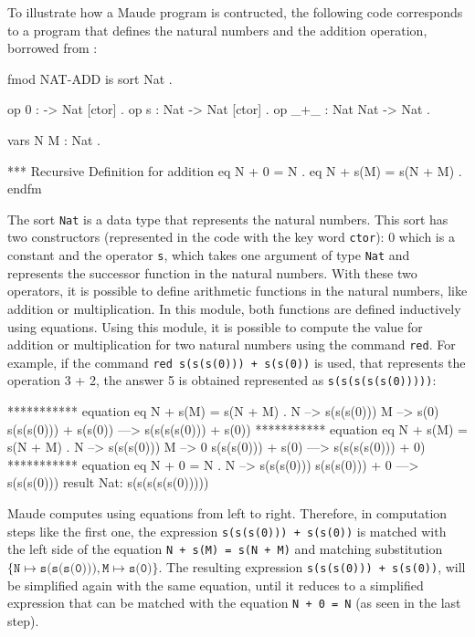 To illustrate how a Maude program is contructed, the following code corresponds to a program that defines the natural numbers and the addition operation, borrowed from \cite{PeterMaude}: 
\\
\begin{maude}
fmod NAT-ADD is
  sort Nat .

  op 0 : -> Nat [ctor] .
  op s : Nat -> Nat [ctor] .
  op _+_ : Nat Nat -> Nat .

  vars N M : Nat .
    
  *** Recursive Definition for addition
  eq N + 0 = N .
  eq N + s(M) = s(N + M) .
endfm
\end{maude}
The sort \texttt{Nat} is a data type that represents the natural numbers. This sort has two constructors (represented in the code with the key word \texttt{ctor}): 0 which is a constant and the operator \texttt{s}, which takes one argument of type \texttt{Nat} and represents the successor function in the natural numbers. With these two operators, it is possible to define arithmetic functions in the natural numbers, like addition or multiplication. In this module, both functions are defined inductively using equations. Using this module, it is possible to compute the value for addition or multiplication for two natural numbers using the command \texttt{red}. For example, if the command \texttt{red s(s(s(0))) + s(s(0))} is used, that represents the operation 3 + 2, the answer 5 is obtained represented as \texttt{s(s(s(s(s(0)))))}:
\\
\begin{maude2}
*********** equation
eq N + s(M) = s(N + M) .
N --> s(s(s(0)))
M --> s(0)
s(s(s(0))) + s(s(0))
--->
s(s(s(s(0))) + s(0))
*********** equation
eq N + s(M) = s(N + M) .
N --> s(s(s(0)))
M --> 0
s(s(s(0))) + s(0)
--->
s(s(s(s(0))) + 0)
*********** equation
eq N + 0 = N .
N --> s(s(s(0)))
s(s(s(0))) + 0
--->
s(s(s(0)))
result Nat: s(s(s(s(s(0)))))
\end{maude2}
Maude computes using equations from left to right. Therefore, in computation steps like the first one, the expression \texttt{s(s(s(0))) + s(s(0))} is matched with the left side of the equation \texttt{N + s(M) = s(N + M)} and matching substitution $\{\texttt{N} \mapsto \texttt{s(s(s(0)))},\texttt{M} \mapsto \texttt{s(0)} \}$. The resulting expression \texttt{s(s(s(0))) + s(s(0))}, will be simplified again with the same equation, until it reduces to a simplified expression that can be matched with the equation \texttt{N + 0 = N} (as seen in the last step).

